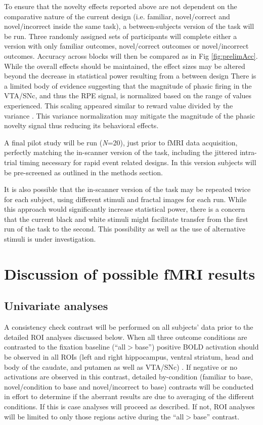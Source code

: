\documentclass[doc]{apa}        %
\begin{document}
To ensure that the novelty effects reported above are not dependent on the comparative nature of the current design (i.e. familiar, novel/correct and novel/incorrect inside the same task), a between-subjects version of the task will be run.  Three randomly assigned sets of participants will complete either a version with only familiar outcomes, novel/correct outcomes or novel/incorrect outcomes.  Accuracy across blocks will then be compared as in Fig \ref{fig:prelimAcc}.  While the overall effects should be maintained, the effect sizes may be altered beyond the decrease in statistical power resulting from a between design  There is a limited body of evidence suggesting that the magnitude of phasic firing in the VTA/SNc, and thus the RPE signal, is normalized based on the range of values experienced.  This scaling appeared similar to reward value divided by the variance \cite{Tobler:2005p6373}.  This variance normalization may mitigate the magnitude of the phasic novelty signal thus reducing its behavioral effects.    

A final pilot study will be run (\emph{N}=20), just prior to fMRI data acquisition, perfectly matching the in-scanner version of the task, including the jittered intra-trial timing necessary for rapid event related designs.   In this version subjects will be pre-screened as outlined in the methods section.  

It is also possible that the in-scanner version of the task may be repeated twice for each subject, using different stimuli and fractal images for each run.  While this approach would significantly increase statistical power, there is a concern that the current black and white stimuli might facilitate transfer from the first run of the task to the second.  This possibility as well as the use of alternative stimuli is under investigation.

\section{Discussion of possible fMRI results} %
\label{sec:discussion_of_possible_fmri_results}
\subsection{Univariate analyses} %
\label{sub:univariate_analyses}
A consistency check contrast will be performed on all subjects' data prior to the detailed ROI analyses discussed below.  When all three outcome conditions are contrasted to the fixation baseline (``all$>$base'') positive BOLD activation should be observed in all ROIs (left and right hippocampus, ventral striatum, head and body of the caudate, and putamen as well as VTA/SNc) \cite{Seger:2010p7188,GuitartMasip:2010p7227}.  If negative or no activations are observed in this contrast, detailed by-condition (familiar to base, novel/condition to base and novel/incorrect to base) contrasts will be conducted in effort to determine if the aberrant results are due to averaging of the different conditions.  If this is case analyses will proceed as described.  If not, ROI analyses will be limited to only those regions active during the ``all$>$base'' contrast.
\end{document}
